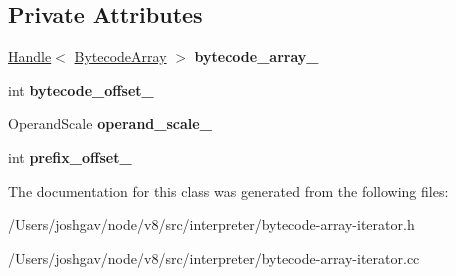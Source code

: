 \subsection*{Private Attributes}
\begin{DoxyCompactItemize}
\item 
\hyperlink{classv8_1_1internal_1_1_handle}{Handle}$<$ \hyperlink{classv8_1_1internal_1_1_bytecode_array}{Bytecode\+Array} $>$ {\bfseries bytecode\+\_\+array\+\_\+}\hypertarget{classv8_1_1internal_1_1interpreter_1_1_bytecode_array_iterator_ab98252b6838a1e588f8ea6f08409dd3b}{}\label{classv8_1_1internal_1_1interpreter_1_1_bytecode_array_iterator_ab98252b6838a1e588f8ea6f08409dd3b}

\item 
int {\bfseries bytecode\+\_\+offset\+\_\+}\hypertarget{classv8_1_1internal_1_1interpreter_1_1_bytecode_array_iterator_a2ac9c2b01d5c358677fa0ba22e2f9c91}{}\label{classv8_1_1internal_1_1interpreter_1_1_bytecode_array_iterator_a2ac9c2b01d5c358677fa0ba22e2f9c91}

\item 
Operand\+Scale {\bfseries operand\+\_\+scale\+\_\+}\hypertarget{classv8_1_1internal_1_1interpreter_1_1_bytecode_array_iterator_a65cf06c2490bdc5e7bbfffb5069e6a50}{}\label{classv8_1_1internal_1_1interpreter_1_1_bytecode_array_iterator_a65cf06c2490bdc5e7bbfffb5069e6a50}

\item 
int {\bfseries prefix\+\_\+offset\+\_\+}\hypertarget{classv8_1_1internal_1_1interpreter_1_1_bytecode_array_iterator_a7c1e19ac51ac83f89175cec227a76bd0}{}\label{classv8_1_1internal_1_1interpreter_1_1_bytecode_array_iterator_a7c1e19ac51ac83f89175cec227a76bd0}

\end{DoxyCompactItemize}


The documentation for this class was generated from the following files\+:\begin{DoxyCompactItemize}
\item 
/\+Users/joshgav/node/v8/src/interpreter/bytecode-\/array-\/iterator.\+h\item 
/\+Users/joshgav/node/v8/src/interpreter/bytecode-\/array-\/iterator.\+cc\end{DoxyCompactItemize}
